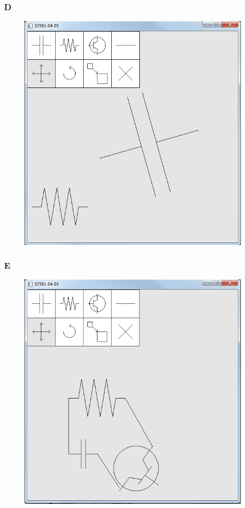 \documentclass[11pt]{article}
\begin{document}
\subsubsection{D}
\begin{figure}[H]
	\centering
	\includegraphics[width=0.5\linewidth]{images/e05p3d}
	\label{fig:e05p3d}
\end{figure}

\subsubsection{E}
\begin{figure}[H]
	\centering
	\includegraphics[width=0.5\linewidth]{images/e05p3f}
	\label{fig:e05p3f}
\end{figure}
\end{document}
